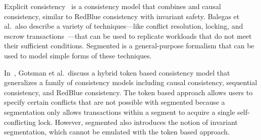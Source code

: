 Explicit consistency~\cite{balegas2015towards} is a consistency model that
combines \invariantconfluence{} and causal consistency, similar to RedBlue
consistency with invariant safety.
%
Balegas et al.\ also describe a variety of techniques---like conflict
resolution, locking, and escrow transactions~\cite{o1986escrow}---that can be
used to replicate workloads that do not meet their sufficient conditions.
Segmented \invariantconfluence{} is a general-purpose formalism that can be
used to model simple forms of these techniques.

In~\cite{gotsman2016cause}, Gotsman et al.\ discuss a hybrid token based
consistency model that generalizes a family of consistency models including
causal consistency, sequential consistency, and RedBlue consistency.
The token based approach allows users to
specify certain conflicts that are not possible with segmented
\invariantconfluence{} because a segmentation only allows transactions within a
segment to acquire a single self-conflicting lock. However, segmented
\invariantconfluence{} also introduces the notion of invariant segmentation,
which cannot be emulated with the token based approach.


